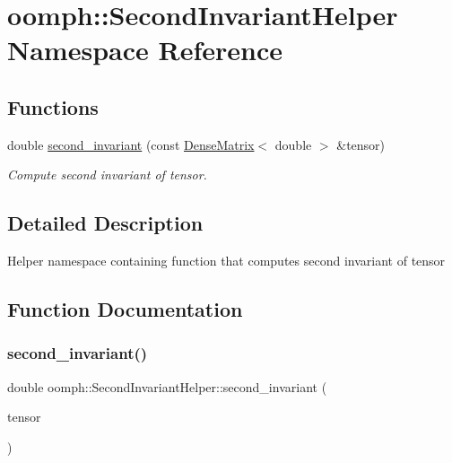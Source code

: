 \hypertarget{namespaceoomph_1_1SecondInvariantHelper}{}\section{oomph\+:\+:Second\+Invariant\+Helper Namespace Reference}
\label{namespaceoomph_1_1SecondInvariantHelper}
\subsection*{Functions}
\begin{DoxyCompactItemize}
\item 
double \hyperlink{namespaceoomph_1_1SecondInvariantHelper_a25244c7a064549dd3f474b0d6ca1fae4}{second\+\_\+invariant} (const \hyperlink{classoomph_1_1DenseMatrix}{Dense\+Matrix}$<$ double $>$ \&tensor)
\begin{DoxyCompactList}\small\item\em Compute second invariant of tensor. \end{DoxyCompactList}\end{DoxyCompactItemize}


\subsection{Detailed Description}
Helper namespace containing function that computes second invariant of tensor 

\subsection{Function Documentation}
\mbox{\label{namespaceoomph_1_1SecondInvariantHelper_a25244c7a064549dd3f474b0d6ca1fae4}} 
\subsubsection{\texorpdfstring{second\+\_\+invariant()}{second\_invariant()}}
{\footnotesize\ttfamily double oomph\+::\+Second\+Invariant\+Helper\+::second\+\_\+invariant (\begin{DoxyParamCaption}\item[{const \hyperlink{classoomph_1_1DenseMatrix}{Dense\+Matrix}$<$ double $>$ \&}]{tensor }\end{DoxyParamCaption})}




